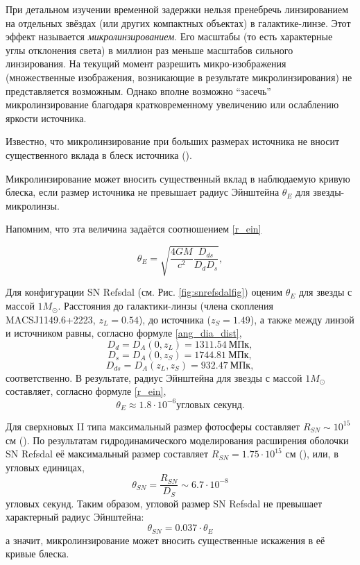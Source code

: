 При детальном изучении временной задержки нельзя пренебречь линзированием на отдельных звёздах (или других компактных объектах) в галактике-линзе. Этот эффект называется \textit{микролинзированием}. Его масштабы (то есть характерные углы отклонения света) в миллион раз меньше масштабов сильного линзирования. На текущий момент разрешить микро-изображения (множественные изображения, возникающие в результате микролинзирования) не представляется возможным. Однако вполне возможно “засечь” микролинзирование благодаря кратковременному увеличению или ослаблению яркости источника. 

Известно, что микролинзирование при больших размерах источника не вносит существенного вклада в блеск источника (\cite{refsdalstabell1991}).

Микролинзирование может вносить существенный вклад в наблюдаемую кривую блеска, если размер источника не превышает радиус Эйнштейна $\theta_E$ для звезды-микролинзы. 

Напомним, что эта величина задаётся соотношением \eqref{r_ein}

$$\theta_{E}=\sqrt{\frac{4 G M}{c^{2}} \frac{D_{d s}}{D_{d} D_{s}}},$$

Для конфигурации SN Refsdal (см. Рис. \ref{fig:snrefsdalfig}) оценим $\theta_E$ для звезды с массой $1 M_{\odot}$. Расстояния до галактики-линзы (члена скопления MACSJ1149.6+2223, $z_L=0.54$), до источника ($z_S=1.49$), а также между линзой и источником равны, согласно формуле \eqref{ang_dia_dist}, 
$$ D_d=D_A(0,z_L)=1311.54 \ \textrm{МПк}, $$
$$ D_s=D_A(0,z_S)=1744.81 \ \textrm{МПк}, $$
$$ D_{ds}=D_A(z_L,z_S)=932.47 \ \textrm{МПк}, $$
соответственно. В результате, радиус Эйнштейна для звезды с массой $1 M_{\odot}$ составляет, согласно формуле \eqref{r_ein}, $$\theta_E \approx 1.8 \cdot 10^{-6} \textrm{угловых секунд.} $$ 

Для сверхновых II типа максимальный размер фотосферы составляет $R_{SN} \sim 10^{15}$ см (\cite{razmer}). По результатам гидродинамического моделирования расширения оболочки SN Refsdal её максимальный размер составляет $R_{SN} = 1.75\cdot10^{15}$ см (\cite{petrnat2020}), или, в угловых единицах, $$\theta_{SN} = \frac{R_{SN}}{D_S} \sim 6.7 \cdot 10^{-8}$$ угловых секунд. Таким образом, угловой размер SN Refsdal не превышает характерный радиус Эйнштейна: $$ \theta_{SN} = 0.037 \cdot \theta_E$$а значит, микролинзирование может вносить существенные искажения в её кривые блеска. %